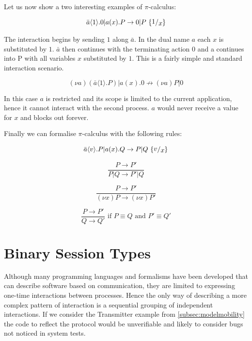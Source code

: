 Let us now show a two interesting examples of $\pi$-calculus:

\[ \bar{a} \langle 1 \rangle .0 | a(x).P \rightarrow 0 | P \mbox{ } \SUBS{1}{x} \]

The interaction begins by sending $1$ along $\bar{a}$. In the dual name $a$ each $x$ is substituted by $1$. $\bar{a}$ then continues with the terminating action $0$ and a continues into P with all variables $x$ substituted by $1$. This is a fairly simple and standard interaction scenario.

$$ (\nu a)(\bar{a} \langle 1 \rangle.P) | a(x).0 \nrightarrow (\nu a) P|0 $$

In this case $a$ is restricted and its scope is limited to the current application, hence it cannot interact with the second process. $a$ would never receive a value for $x$ and blocks out forever.

Finally we can formalise ${\pi}$-calculus with the following rules:

\begin{equation} \bar{a} \langle v \rangle .P | a(x).Q \rightarrow P|Q \text{ } {\SUBS{v}{x}} \end{equation}

\begin{equation} \frac{P \rightarrow P'}{P|Q \rightarrow P'|Q} \end{equation}

\begin{equation} \frac{P \rightarrow P'}{(\nu x) P \rightarrow (\nu x) P'} \end{equation}

\begin{equation} \frac{P \rightarrow P'}{Q \rightarrow Q'} \mbox{ if } P \equiv Q \mbox{ and } P' \equiv Q' \end{equation}
\newline


	
\section{Binary Session Types}
\label{sec:binsessiontypes}
		
	Although many programming languages and formalisms have been developed that can describe software based on communication, they are limited to expressing one-time interactions between processes. Hence the only way of describing a more complex pattern of interaction is a sequential grouping of independent interactions. If we consider the Transmitter example from \autoref{subsec:modelmobility} the code to reflect the protocol would be unverifiable and likely to consider bugs not noticed in system tests.

